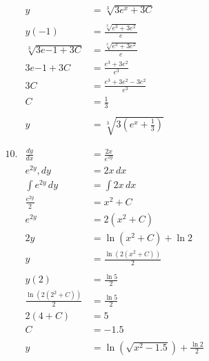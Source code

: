 \documentclass[12pt]{article}
\begin{document}
\begin{multicols*}{2}
\begin{align*}
        &&y &= \sqrt[3]{3e^x + 3C} \\ \\
        &&y(-1) &= \frac{\sqrt[3]{e^3 + 3e^2}}{e} \\
        &&\sqrt[3]{3e{-1} + 3C} &= \frac{\sqrt[3]{e^3 + 3e^2}}{e} \\
        &&3e{-1} + 3C &= \frac{e^3 + 3e^2}{e^3} \\
        &&3C &= \frac{e^3 + 3e^2 - 3e^2}{e^3} \\
        &&C &= \frac{1}{3} \\ \\
        &&y &= \sqrt[3]{3\left(e^x + \frac{1}{3}\right)} \\ \\ \\
        &10.& \frac{dy}{dx} &= \frac{2x}{e^{2y}} \\
        &&e^{2y},dy &= 2x\,dx \\
        &&\int e^{2y}\,dy &= \int 2x\,dx \\
        &&\frac{e^{2y}}{2} &= x^2 + C \\
        &&e^{2y} &= 2\left(x^2 + C\right) \\
        &&2y &= \ln \left( x^2 + C \right) + \ln 2 \\
        &&y &= \frac{\ln \left(2\left(x^2+C\right)\right)}{2} \\ \\
        &&y(2) &= \frac{\ln 5}{2} \\
        &&\frac{\ln \left(2\left(2^2+C\right)\right)}{2} &= \frac{\ln 5}{2} \\
        &&2(4+C) &= 5 \\
        &&C &= -1.5 \\ \\
        &&y &= \ln \left( \sqrt{x^2 - 1.5} \right) + \frac{\ln 2}{2} 
    \end{align*}
\end{multicols*}
\pagebreak
\end{document}
